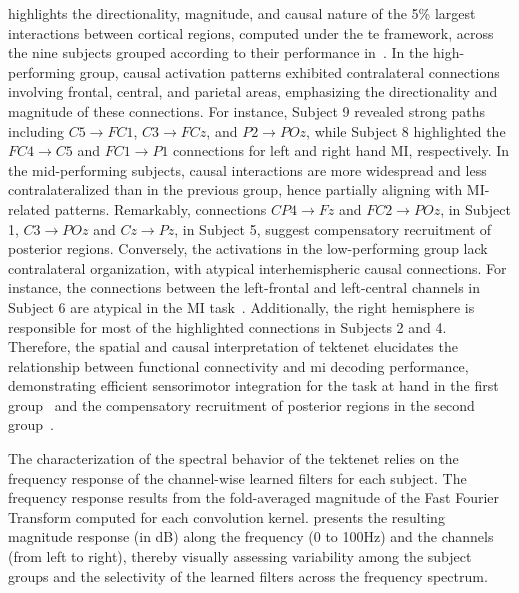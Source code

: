  highlights the directionality, magnitude, and causal nature of the 5\% largest interactions between cortical regions, computed under the \gls{te} framework, across the nine subjects grouped according to their performance in~. In the high-performing group, causal activation patterns exhibited contralateral connections involving frontal, central, and parietal areas, emphasizing the directionality and magnitude of these connections. For instance, Subject 9 revealed strong paths including $C5\rightarrow FC1$, $C3\rightarrow FCz$, and $P2\rightarrow POz$, while Subject 8 highlighted the $FC4\rightarrow C5$ and $FC1\rightarrow P1$ connections for left and right hand MI, respectively. In the mid-performing subjects, causal interactions are more widespread and less contralateralized than in the previous group, hence partially aligning with MI-related patterns. Remarkably, connections $CP4\rightarrow Fz$ and $FC2\rightarrow POz$, in Subject 1, $C3\rightarrow POz$ and $Cz\rightarrow Pz$, in Subject 5, suggest compensatory recruitment of posterior regions. Conversely, the activations in the low-performing group lack contralateral organization, with atypical interhemispheric causal connections. For instance, the connections between the left-frontal and left-central channels in Subject 6 are atypical in the MI task~\cite{almohammadi2024}. Additionally, the right hemisphere is responsible for most of the highlighted connections in Subjects 2 and 4. Therefore, the spatial and causal interpretation of \gls{tektenet} elucidates the relationship between functional connectivity and \gls{mi} decoding performance, demonstrating efficient sensorimotor integration for the task at hand in the first group~\cite{leeuwis2021functional,vidaurre2020sensorimotor} and the compensatory recruitment of posterior regions in the second group~\cite{angulo2025proficiency}.

The characterization of the spectral behavior of the \gls{tektenet} relies on the frequency response of the channel-wise learned filters for each subject. The frequency response results from the fold-averaged magnitude of the Fast Fourier Transform computed for each convolution kernel.  presents the resulting magnitude response (in dB) along the frequency (0 to 100Hz) and the channels (from left to right), thereby visually assessing variability among the subject groups and the selectivity of the learned filters across the frequency spectrum.

